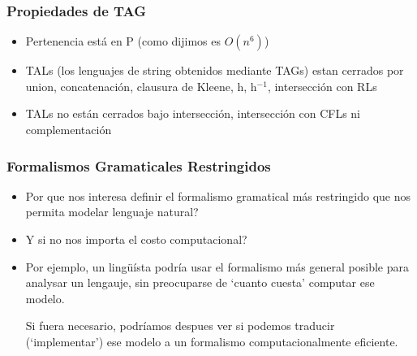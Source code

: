\documentclass[compress,color=usenames]{beamer}
\begin{document}
\begin{frame}
\frametitle{Propiedades de TAG}

\begin{itemize}

\item Pertenencia est\'a en P (como dijimos es $O(n^6)$) \pause

\item TALs (los lenguajes de string obtenidos mediante TAGs) estan cerrados 
por union, concatenaci\'on, clausura de Kleene, h, h$^{-1}$, intersecci\'on
con RLs \pause

\item TALs no est\'an cerrados bajo intersecci\'on, intersecci\'on con CFLs 
ni complementaci\'on

\end{itemize}

\end{frame}

\begin{frame}
\frametitle{Formalismos Gramaticales Restringidos}

\begin{itemize}

\item Por que nos interesa definir el formalismo gramatical m\'as 
restringido que nos permita modelar lenguaje natural? \pause

\item Y si no nos importa el costo computacional?

\item Por ejemplo, un ling\"u\'ista podr\'ia usar el formalismo m\'as 
general posible para analysar un lengauje, sin preocuparse de `cuanto cuesta' 
computar ese modelo. 

\pause Si fuera necesario, podr\'iamos despues ver si podemos traducir 
(`implementar') ese modelo a un formalismo computacionalmente eficiente. 

\end{itemize}
\end{frame}
\end{document}
